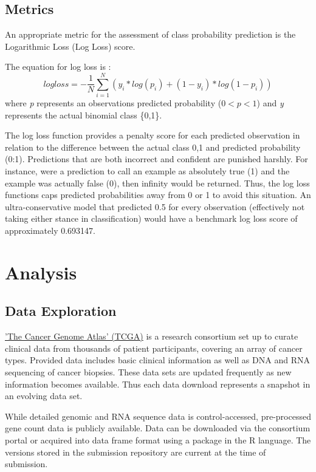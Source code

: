 \documentclass[final]{article}
\begin{document}
\subsection{Metrics}

An appropriate metric for the assessment of class probability prediction is the
Logarithmic Loss (Log Loss) score.

The equation for log loss is : $$ logloss = -\frac{1}{N} \sum_{i=1}^{N} (y_i
*log(p_i) + (1- y_i) * log(1-p_i)) $$ where \textit{p} represents an observations
predicted probability ($0 < \textit{p} < 1$) and \textit{y} represents the actual binomial class
\{0,1\}.

The log loss function provides a penalty score for each predicted observation in
relation to the difference between the actual class {0,1} and predicted
probability (0:1).  Predictions that are both incorrect and confident are
punished harshly.  For instance, were a prediction to call an example as
absolutely true (1) and the example was actually false (0), then infinity would
be returned. Thus, the log loss functions caps predicted probabilities
away from 0 or 1 to  avoid this situation.  An ultra-conservative model that
predicted 0.5 for every observation (effectively not taking either stance in
classification) would have a benchmark log loss score of approximately 0.693147.

\section{Analysis}

\subsection{Data Exploration}

\href{www.http://cancergenome.nih.gov/}{'The Cancer Genome Atlas' (TCGA)} is a
research consortium set up to curate clinical data from thousands of patient
participants, covering an array of cancer types.   Provided data includes basic
clinical information as well as DNA and RNA sequencing of cancer biopsies. These
data sets are updated frequently as new information becomes available.  Thus
each data download represents a snapshot in an evolving data set.

While detailed genomic and RNA sequence data is control-accessed, pre-processed
gene count data is publicly available.  Data can be downloaded via the
consortium  portal or acquired into data frame format using a package in the R
language.  The versions stored in the submission repository are current at
the time of submission.
\end{document}
